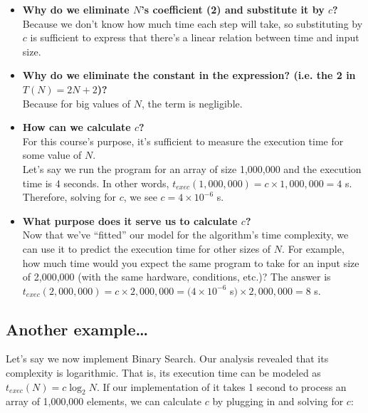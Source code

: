\documentclass[11 pt]{article}
\begin{document}
\begin{itemize}
    \item \textbf{Why do we eliminate $N$'s coefficient (2) and substitute it by $c$?} \\

    Because we don't know how much time each step will take, so substituting by $c$ is sufficient to express that there's a linear relation between time and input size.

    \item \textbf{Why do we eliminate the constant in the expression? (i.e. the 2 in $T(N) = 2N + 2$)?} \\
    
    Because for big values of $N$, the term is negligible.  

    \item \textbf{How can we calculate $c$?} \\

    For this course's purpose, it's sufficient to measure the execution time for some value of $N$. \\ Let's say we run the program for an array of size 1,000,000 and the execution time is 4 seconds. In other words, $t_{exec}(1,000,000) = c \times 1,000,000 = 4$ s. Therefore, solving for $c$, we see $c = 4 \times 10^{-6}$ s.
    
    \item \textbf{What purpose does it serve us to calculate $c$?} \\

    Now that we've ``fitted'' our model for the algorithm's time complexity, we can use it to predict the execution time for other sizes of $N$. For example, how much time would you expect the same program to take for an input size of 2,000,000 (with the same hardware, conditions, etc.)? The answer is $t_{exec}(2,000,000) = c \times 2,000,000 = (4 \times 10^{-6}$ s$) \times 2,000,000 = 8$ s.
\end{itemize}

\newpage

\subsection{Another example\dots}

Let's say we now implement Binary Search. Our analysis revealed that its complexity is logarithmic. That is, its execution time can be modeled as $t_{exec}(N) = c\log_{2} N$. If our implementation of it takes 1 second to process an array of 1,000,000 elements, we can calculate $c$ by plugging in and solving for $c$: \\
\end{document}
